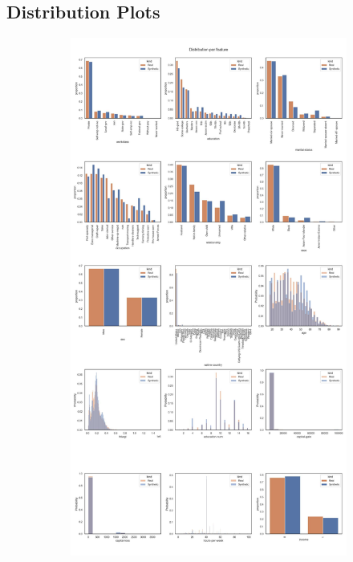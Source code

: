 \subsection[]{Distribution Plots}
\label{A:distributions}
\newpage
\begin{landscape}
	\begin{figure}[h]
		\centering
		\hfill
		\begin{subfigure}{0.3\linewidth}
			\includegraphics[height=\textheight,width=\linewidth,keepaspectratio]{images/distributions_full/ctabgan.jpg}

\end{subfigure}
\end{figure}
\end{landscape}
